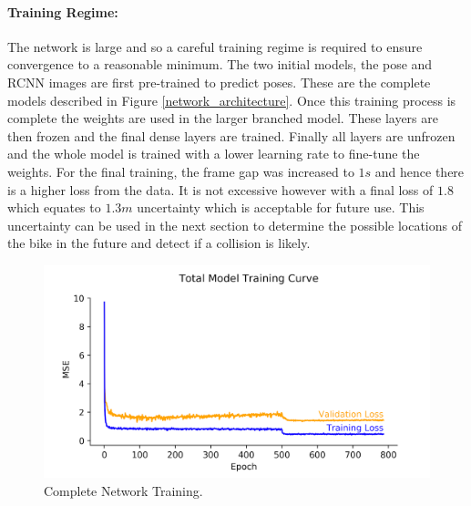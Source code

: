 \documentclass[11pt,twoside]{report}
\begin{document}
\paragraph{Training Regime:}The network is large and so a careful training regime is required to ensure convergence to a reasonable minimum. The two initial models, the pose and RCNN images are first pre-trained to predict poses. These are the complete models described in Figure \ref{network_architecture}. Once this training process is complete the weights are used in the larger branched model. These layers are then frozen and the final dense layers are trained. Finally all layers are unfrozen and the whole model is trained with a lower learning rate to fine-tune the weights. For the final training, the frame gap was increased to $1s$ and hence there is a higher loss from the data. It is not excessive however with  a final loss of $1.8$ which equates to $1.3m$ uncertainty which is acceptable for future use. This uncertainty can be used in the next section to determine the possible locations of the bike in the future and detect if a collision is likely.


\noindent \begin{figure}[h!]
	\includegraphics[width = 1.0\hsize]{figures/total_model_training.png}
	\caption{Complete Network Training.}
	\label{total_training_curve}
\end{figure}
\end{document}
